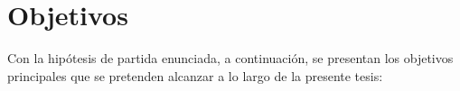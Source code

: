 \section{Objetivos}
\label{intro:objetivos}

Con la hipótesis de partida enunciada, a continuación, se presentan los objetivos principales que se pretenden alcanzar a lo largo de la presente tesis:

